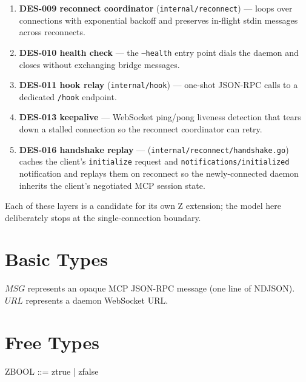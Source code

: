 \documentclass[a4paper,10pt,fleqn]{article}
\begin{document}
\begin{enumerate}
  \item \textbf{DES-009 reconnect coordinator}
    (\texttt{internal/reconnect}) --- loops over connections with
    exponential backoff and preserves in-flight stdin messages across
    reconnects.
  \item \textbf{DES-010 health check} --- the \texttt{--health} entry
    point dials the daemon and closes without exchanging bridge
    messages.
  \item \textbf{DES-011 hook relay} (\texttt{internal/hook}) ---
    one-shot JSON-RPC calls to a dedicated \texttt{/hook} endpoint.
  \item \textbf{DES-013 keepalive} --- WebSocket ping/pong liveness
    detection that tears down a stalled connection so the reconnect
    coordinator can retry.
  \item \textbf{DES-016 handshake replay} ---
    (\texttt{internal/reconnect/handshake.go}) caches the client's
    \texttt{initialize} request and \texttt{notifications/initialized}
    notification and replays them on reconnect so the newly-connected
    daemon inherits the client's negotiated MCP session state.
\end{enumerate}

Each of these layers is a candidate for its own Z extension; the model
here deliberately stops at the single-connection boundary.

\section{Basic Types}

\begin{zed}
\end{zed}

$MSG$ represents an opaque MCP JSON-RPC message (one line of NDJSON).
$URL$ represents a daemon WebSocket URL.

\section{Free Types}

\begin{zed}
  ZBOOL ::= ztrue | zfalse
\end{zed}
\end{document}
